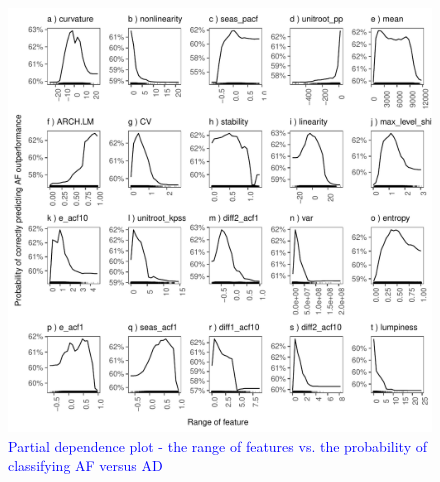 \documentclass[preprint, 3p,
authoryear]{elsarticle} %
\begin{document}
\begin{figure}[H]

{\centering \includegraphics[width=1\linewidth]{img/300dpi/partial_dependence1} 

}

\caption{ \textcolor{blue}{Partial dependence plot - the range of features vs. the probability of classifying AF versus AD} }\label{fig:pdpcommon1}
\end{figure}
\end{document}
